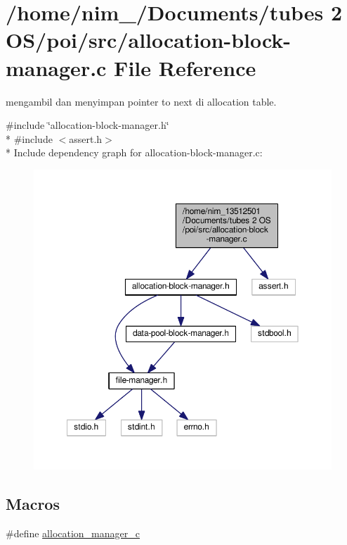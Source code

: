 \hypertarget{allocation-block-manager_8c}{\section{/home/nim\-\_/\-Documents/tubes 2 O\-S/poi/src/allocation-\/block-\/manager.c File Reference}
\label{allocation-block-manager_8c}
}


mengambil dan menyimpan pointer to next di allocation table.  


{\ttfamily \#include \char`\"{}allocation-\/block-\/manager.\-h\char`\"{}}\\*
{\ttfamily \#include $<$assert.\-h$>$}\\*
Include dependency graph for allocation-\/block-\/manager.c\-:\nopagebreak
\begin{figure}[H]
\begin{center}
\leavevmode
\includegraphics[width=350pt]{allocation-block-manager_8c__incl}
\end{center}
\end{figure}
\subsection*{Macros}
\begin{DoxyCompactItemize}
\item 
\#define \hyperlink{allocation-block-manager_8c_a7c27d1e5590b712625952d2abcef87f2}{allocation\-\_\-manager\-\_\-c}
\end{DoxyCompactItemize}
